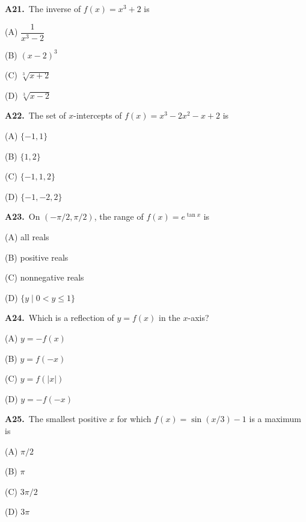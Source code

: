 \documentclass[11pt]{article}
\begin{document}
\bigskip\noindent\textbf{A21.}\ The inverse of $f(x)=x^3+2$ is
\begin{list}{}{\setlength{\leftmargin}{3em}\setlength{\labelwidth}{2.5em}\setlength{\itemsep}{0pt}\setlength{\topsep}{2pt}}
\item[(A)] $\dfrac1{x^3-2}$
\item[(B)] $(x-2)^3$
\item[(C)] $\sqrt[3]{x+2}$
\item[(D)] $\sqrt[3]{x-2}$
\end{list}

\bigskip\noindent\textbf{A22.}\ The set of $x$-intercepts of $f(x)=x^3-2x^2-x+2$ is
\begin{list}{}{\setlength{\leftmargin}{3em}\setlength{\labelwidth}{2.5em}\setlength{\itemsep}{0pt}\setlength{\topsep}{2pt}}
\item[(A)] $\{-1,1\}$
\item[(B)] $\{1,2\}$
\item[(C)] $\{-1,1,2\}$
\item[(D)] $\{-1,-2,2\}$
\end{list}

\bigskip\noindent\textbf{A23.}\ On $(-\pi/2,\pi/2)$, the range of $f(x)=e^{\tan x}$ is
\begin{list}{}{\setlength{\leftmargin}{3em}\setlength{\labelwidth}{2.5em}\setlength{\itemsep}{0pt}\setlength{\topsep}{2pt}}
\item[(A)] all reals
\item[(B)] positive reals
\item[(C)] nonnegative reals
\item[(D)] $\{y\mid0<y\le1\}$
\end{list}

\bigskip\noindent\textbf{A24.}\ Which is a reflection of $y=f(x)$ in the $x$-axis?
\begin{list}{}{\setlength{\leftmargin}{3em}\setlength{\labelwidth}{2.5em}\setlength{\itemsep}{0pt}\setlength{\topsep}{2pt}}
\item[(A)] $y=-f(x)$
\item[(B)] $y=f(-x)$
\item[(C)] $y=f(|x|)$
\item[(D)] $y=-f(-x)$
\end{list}

\bigskip\noindent\textbf{A25.}\ The smallest positive $x$ for which $f(x)=\sin(x/3)-1$ is a maximum is
\begin{list}{}{\setlength{\leftmargin}{3em}\setlength{\labelwidth}{2.5em}\setlength{\itemsep}{0pt}\setlength{\topsep}{2pt}}
\item[(A)] $\pi/2$
\item[(B)] $\pi$
\item[(C)] $3\pi/2$
\item[(D)] $3\pi$
\end{list}
\end{document}
